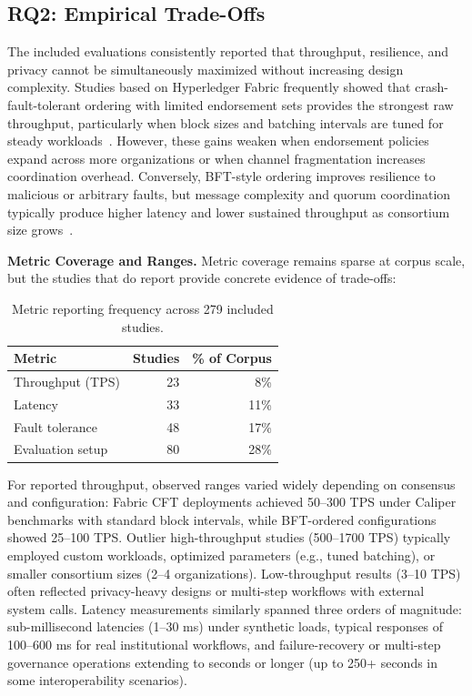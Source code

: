 \documentclass[journal]{IEEEtran}
\begin{document}
\subsection{RQ2: Empirical Trade-Offs}

The included evaluations consistently reported that throughput, resilience, and privacy cannot be simultaneously maximized without increasing design complexity. Studies based on Hyperledger Fabric frequently showed that crash-fault-tolerant ordering with limited endorsement sets provides the strongest raw throughput, particularly when block sizes and batching intervals are tuned for steady workloads~\cite{dinh2017blockbench,gorenflo2020fastfabric,thakkar2018performance,nasir2022performance,dadkhah2025tuning,nunes2025permissioned}. However, these gains weaken when endorsement policies expand across more organizations or when channel fragmentation increases coordination overhead. Conversely, BFT-style ordering improves resilience to malicious or arbitrary faults, but message complexity and quorum coordination typically produce higher latency and lower sustained throughput as consortium size grows~\cite{sousa2018byzantine,castro1999practical,crain2018dbft,wu2023sharding,zhong2023stpbft}.

\textbf{Metric Coverage and Ranges.}
Metric coverage remains sparse at corpus scale, but the studies that do report provide concrete evidence of trade-offs:

\begin{table}[h]
\centering
\small
\begin{tabular}{lrr}
\toprule
\textbf{Metric} & \textbf{Studies} & \textbf{\% of Corpus} \\
\midrule
Throughput (TPS) & 23 & 8\% \\
Latency & 33 & 11\% \\
Fault tolerance & 48 & 17\% \\
Evaluation setup & 80 & 28\% \\
\bottomrule
\end{tabular}
\caption{Metric reporting frequency across 279 included studies.}
\label{tab:metric-coverage}
\end{table}

\noindent For reported throughput, observed ranges varied widely depending on consensus and configuration: Fabric CFT deployments achieved 50--300 TPS under Caliper benchmarks with standard block intervals, while BFT-ordered configurations showed 25--100 TPS. Outlier high-throughput studies (500--1700 TPS) typically employed custom workloads, optimized parameters (e.g., tuned batching), or smaller consortium sizes (2--4 organizations). Low-throughput results (3--10 TPS) often reflected privacy-heavy designs or multi-step workflows with external system calls. Latency measurements similarly spanned three orders of magnitude: sub-millisecond latencies (1--30 ms) under synthetic loads, typical responses of 100--600 ms for real institutional workflows, and failure-recovery or multi-step governance operations extending to seconds or longer (up to 250+ seconds in some interoperability scenarios).
\end{document}
